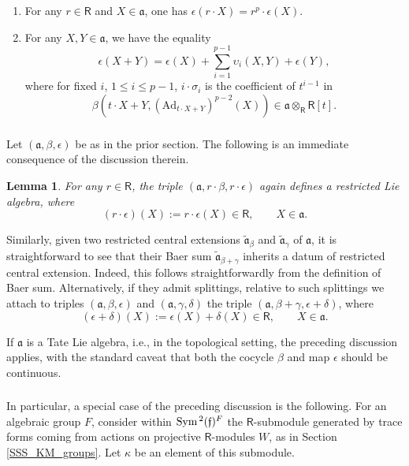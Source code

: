 \documentclass{amsart}
\newtheorem{Lem}[Thm]{Lemma}
\theoremstyle{definition}
\newcommand{\fa}{\mathfrak{a}}
\newcommand{\sss}{\subsubsection{}}
\newcommand{\Sym}{\on{Sym}\hspace{.5mm}}
\newcommand{\on}{\mathrm}
\newcommand{\Ring}{\mathsf{R}}
\newcommand{\ff}{\mathfrak{f}}
\numberwithin{equation}{section}
\begin{document}
\begin{enumerate}[resume]
  \item For any $r \in \Ring$ and $X \in \fa$, one has $\epsilon(r \cdot X) = r^p \cdot \epsilon(X).$

  \item For any $X,Y \in \fa$, we have the equality
$$\epsilon(X+Y) = \epsilon(X) + \sum_{i=1}^{p-1} \upsilon_i(X,Y) + \epsilon(Y),$$
where for fixed $i$, $1 \leqslant i \leqslant p-1$, $i \cdot \sigma_i$ is the coefficient of $t^{i-1}$ in 
$$\beta( t \cdot X + Y, (\on{Ad}_{t \cdot X + Y})^{p-2}(X)) \in \fa \otimes_{\Ring} \Ring[t].$$
\end{enumerate}




\sss Let $(\fa, \beta, \epsilon)$ be as in the prior section. The following is an immediate consequence of the discussion therein. 

\begin{Lem}\label{l:scale} For any $r \in \Ring$, the triple $(\fa, r \cdot \beta, r \cdot \epsilon)$ again defines a restricted Lie algebra, where $$(r \cdot \epsilon)(X) := r \cdot \epsilon(X) \in \Ring, \quad \quad X \in \fa.$$     
\end{Lem}

Similarly, given two restricted central extensions $\widetilde{\fa}_\beta$ and $\widetilde{\fa}_\gamma$ of $\fa$, it is straightforward to see that their Baer sum $\widetilde{\fa}_{\beta + \gamma}$ inherits a datum of restricted central extension. Indeed, this follows straightforwardly from the definition of Baer sum. Alternatively, if they admit splittings, relative to such splittings we attach to triples $(\fa, \beta, \epsilon)$ and $(\fa, \gamma, \delta)$ the triple $(\fa, \beta + \gamma, \epsilon + \delta)$, where 
$$(\epsilon  + \delta)(X) := \epsilon(X) + \delta(X) \in \Ring, \quad \quad X \in \fa.$$


If $\fa$ is a Tate Lie algebra, i.e., in the topological setting, the preceding discussion applies, with the standard caveat that both the cocycle $\beta$ and map $\epsilon$ should be continuous. 



\sss In particular, a special case of the preceding discussion is the following. For an algebraic group $F$, consider within $\Sym^2(\ff)^F$ the $\Ring$-submodule generated by trace forms coming from actions on projective $\Ring$-modules $W$, as in Section \ref{SSS_KM_groups}. Let $\kappa$ be an element of this submodule. 
\end{document}
